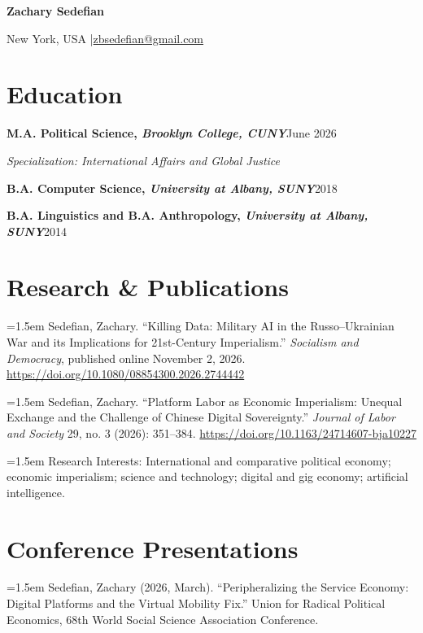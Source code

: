 \documentclass[11pt,letterpaper]{article}
\newcommand{\entry}[3]{%
  \par{\bfseries #1}\hfill #2\par\nopagebreak
  {\itshape #3}\par\nopagebreak
}
\newcommand{\hang}[1]{%
  \par\hangindent=1.5em\hangafter=1 #1\par\vspace{5pt}%
}
\newcommand{\gap}{\par\vspace{7pt}}
\begin{document}
\begin{center}
  {\LARGE\bfseries Zachary Sedefian}\par\vspace{4pt}
  New York, USA \enspace|\enspace \href{mailto:zbsedefian@gmail.com}{zbsedefian@gmail.com}
\end{center}

\section*{Education}

\entry{M.A. Political Science, \textit{Brooklyn College, CUNY}}{June 2026}{Specialization: International Affairs and Global Justice}
\gap
\par{\bfseries B.A. Computer Science, \textit{University at Albany, SUNY}}\hfill 2018\par
\vspace{3pt}
\par{\bfseries B.A. Linguistics and B.A. Anthropology, \textit{University at Albany, SUNY}}\hfill 2014\par

\section*{Research \& Publications}

\hang{Sedefian, Zachary. “Killing Data: Military AI in the Russo–Ukrainian War and its Implications for 21st-Century Imperialism.” \textit{Socialism and Democracy}, published online November 2, 2026. \url{https://doi.org/10.1080/08854300.2026.2744442}}

\hang{Sedefian, Zachary. “Platform Labor as Economic Imperialism: Unequal Exchange and the Challenge of Chinese Digital Sovereignty.” \textit{Journal of Labor and Society} 29, no. 3 (2026): 351–384. \url{https://doi.org/10.1163/24714607-bja10227}}

\hang{Research Interests: International and comparative political economy; economic imperialism; science and technology; digital and gig economy; artificial intelligence.}

\section*{Conference Presentations}

\hang{Sedefian, Zachary (2026, March). “Peripheralizing the Service Economy: Digital Platforms and the Virtual Mobility Fix.” Union for Radical Political Economics, 68th World Social Science Association Conference.}
\end{document}
